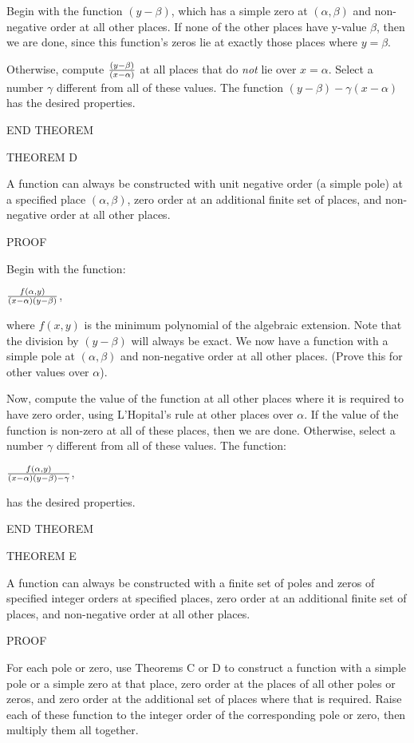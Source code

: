 Begin with the function $(y-\beta)$, which has a simple zero at
$(\alpha, \beta)$ and non-negative order at all other places.
If none of the other places have y-value $\beta$, then we
are done, since this function's zeros lie at exactly those
places where $y = \beta$.

Otherwise, compute $(y-\beta)\over(x-\alpha)$ at all places
that do {\it not} lie over $x = \alpha$.  Select a number
$\gamma$ different from all of these values.  The function
$(y-\beta) - \gamma (x-\alpha)$ has the desired properties.

END THEOREM

THEOREM D

A function can always be constructed with unit negative order (a
simple pole) at a specified place $(\alpha, \beta)$, zero order at an
additional finite set of places, and non-negative order at all other
places.

PROOF

Begin with the function:

$f(\alpha,y)\over(x-\alpha)(y-\beta)$,

where $f(x,y)$ is the minimum polynomial of the algebraic extension.
Note that the division by $(y-\beta)$ will always be exact.  We now
have a function with a simple pole at $(\alpha, \beta)$ and non-negative
order at all other places. (Prove this for other values over $\alpha$).

Now, compute the value of the function at all other places where it
is required to have zero order, using L'Hopital's rule at other
places over $\alpha$.  If the value of the function is non-zero
at all of these places, then we are done.  Otherwise, select a 
number $\gamma$ different from all of these values.  The function:

$f(\alpha,y)\over(x-\alpha)(y-\beta) - \gamma$,

has the desired properties.

END THEOREM

THEOREM E

A function can always be constructed with a finite set of poles and
zeros of specified integer orders at specified places, zero order at
an additional finite set of places, and non-negative order at all
other places.

PROOF

For each pole or zero, use Theorems C or D to construct a function
with a simple pole or a simple zero at that place, zero order at the
places of all other poles or zeros, and zero order at the additional
set of places where that is required.  Raise each of these function to
the integer order of the corresponding pole or zero, then multiply
them all together.

